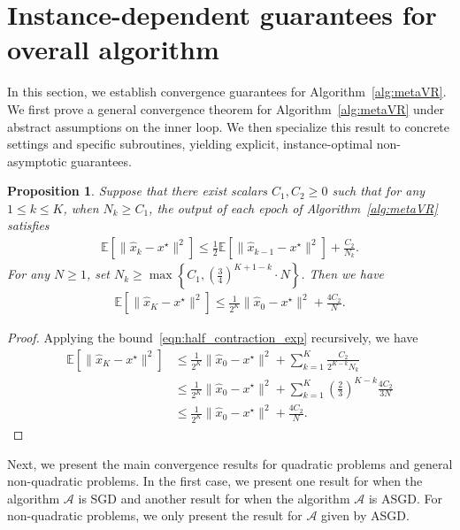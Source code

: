 \documentclass[11pt,twoside]{article}
\numberwithin{equation}{section}
\newcommand{\cA}{\mathcal{A}}
\newcommand{\EE}{\mathbb{E}}
\newcommand{\1}{\mathbf{1}}
\newtheorem{proposition}[theorem]{Proposition}
\theoremstyle{remark}
\theoremstyle{plain}
\begin{document}
\section{Instance-dependent guarantees for overall algorithm} \label{sec:overall_complexity}
In this section, we establish convergence guarantees for Algorithm~\ref{alg:metaVR}. We first prove a general convergence theorem for Algorithm~\ref{alg:metaVR} under abstract assumptions on the inner loop. We then specialize this result to concrete settings and specific subroutines, yielding explicit, instance-optimal non-asymptotic guarantees.
\begin{proposition}\label{prop:meta_convergence}
Suppose that there exist scalars $C_1, C_2 \ge 0$ such that  for any $1\le k \le K$, when $N_k \ge C_1$, the output of each epoch of Algorithm~\ref{alg:metaVR}  satisfies 
\begin{align}\label{eqn:half_contraction_exp}
	\EE[\|\widehat x_k - x^\star\|^2] \le \frac{1}{2} \EE[\|\widehat x_{k-1} - x^\star\|^2] + \frac{C_2}{N_k}.
\end{align}
For any $N \ge 1$, set $N_k \ge \max \left\{ C_1, \left(\frac{3}{4} \right)^{K+1 -k} \cdot N \right\}$. Then  we have 
\begin{align*}
	\EE[\|\widehat x_K - x^\star\|^2] \le \frac{1}{2^K} \|\widehat x_0 - x^\star\|^2 + \frac{4C_2 }{N}.
\end{align*}
\end{proposition}
\begin{proof}
Applying the bound~\eqref{eqn:half_contraction_exp} recursively, we have
\begin{align*}
	\EE[\|\widehat x_K - x^\star\|^2] &\le \frac{1}{2^K}\|\widehat x_0 -x^\star\|^2 +  \sum_{k=1}^{K} \frac{C_2}{2^{K-k} N_k}\\
	&\le \frac{1}{2^K}\|\widehat x_0 -x^\star\|^2 + \sum_{k=1}^{K} \left(\frac{2}{3}\right)^{K-k}\frac{4C_2}{3 N} \\
	&\le   \frac{1}{2^K}\|\widehat x_0 -x^\star\|^2 + \frac{4C_2}{N}.
\end{align*}
\end{proof}
Next, we present the main convergence results for quadratic problems and general non-quadratic problems. In the first case, we present one result for when the algorithm $\cA$ is SGD and another result for when the algorithm $\cA$ is ASGD. For non-quadratic problems, we only present the result for $\cA$ given by ASGD.
\end{document}
